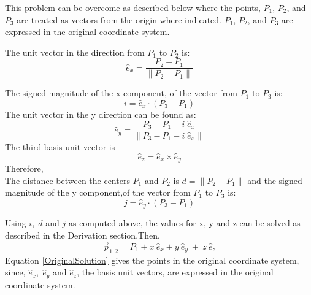 This problem can be overcome as described below where the points, $P_1$, $P_2$, and $P_3$ are treated as vectors from the origin where indicated. $P_1$, $P_2$, and $P_3$ are expressed in the original coordinate system.

The unit vector in the direction from $P_1$ to $P_2$ is:
\begin{equation}
\hat e_x = \frac{ P_2 - P_1 }{ \| P_2 - P_1 \| } \nonumber
\end{equation}

The signed magnitude of the x component, of the vector from $P_1$ to $P_3$ is:
\begin{equation}
i = \hat e_x \cdot ( P_3 - P_1 )  \nonumber
\end{equation}
The unit vector in the y direction can be found as:
\begin{equation}
\hat e_y = \frac{ P_3 - P_1 - i \; \hat e_x}{ \| P_3 - P_1 - i \; \hat e_x \| } \nonumber
\end{equation}
The third basis unit vector is 
\begin{equation}
\hat e_z = \hat e_x \times \hat e_y \nonumber
\end{equation}
Therefore, \\
The distance between the centers $P_1$ and $P_2$ is $d = \| P_2 - P_1 \|$  and the signed magnitude of the y component,of the vector from $P_1$ to $P_3$ is:
\begin{equation}
j = \hat e_y \cdot ( P_3 - P_1 ) \nonumber
\end{equation}


Using $i, \;  d$ and $j$ as computed above, the values for x, y and z can be solved as described in the Derivation section.Then,
\begin{equation}
	\vec p_{1,2} = P_1 + x \ \hat e_x + y \ \hat e_y \ \pm \ z \ \hat e_z
	\label{OriginalSolution}
\end{equation}
Equation \ref{OriginalSolution} gives the points in the original coordinate system, since, $\hat e_x, \; \hat e_y$ and $\hat e_z$, the basis unit vectors, are expressed in the original coordinate system.
